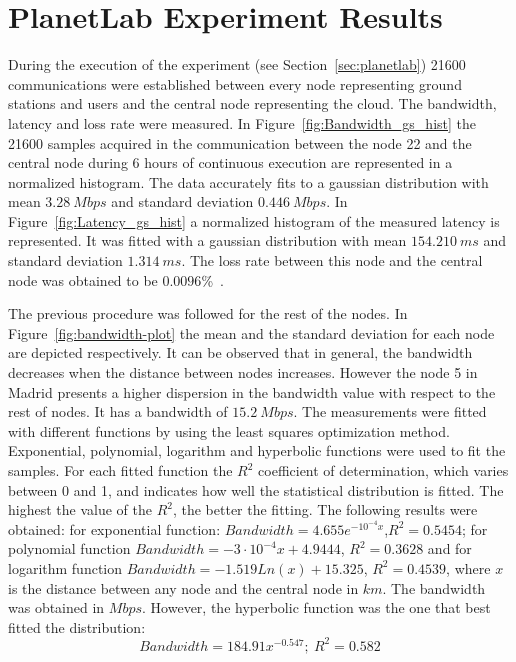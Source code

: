 
\section{PlanetLab Experiment Results}

During the execution of the \pl experiment (see Section~\ref{sec:planetlab}) 21600 communications were established between every node representing ground stations and users and the central node representing the cloud. The bandwidth, latency and loss rate were measured.
In Figure~\ref{fig:Bandwidth_gs_hist} the 21600 samples acquired in the communication between the node 22 and the central node during 6 hours of continuous execution are represented in a normalized histogram. The data accurately fits to a gaussian distribution with mean $3.28~Mbps$ and standard deviation $0.446~Mbps$. In Figure~\ref{fig:Latency_gs_hist} a normalized histogram of the measured latency is represented. It was fitted with a gaussian distribution with mean $154.210~ms$ and standard deviation $1.314~ms$. The loss rate between this node and the central node was obtained to be $0.0096$\%~\cite{Gonzalez2014}.
\begin{figure*}
\begin{center}
\hspace{0.01\textwidth}
\end{center}
\end{figure*}



The previous procedure was followed for the rest of the nodes. In
Figure~\ref{fig:bandwidth-plot} the mean and the standard deviation for each
node are depicted respectively. It can be observed that in general, the
bandwidth decreases when the distance between nodes increases. However the node
5 in Madrid presents a higher dispersion in the bandwidth value with respect to
the rest of nodes. It has a bandwidth of $15.2~Mbps$. The measurements were
fitted with different functions by using the least squares optimization
method. Exponential, polynomial, logarithm and hyperbolic functions were used to
fit the samples. For each fitted function the $R^2$ coefficient of
determination, which varies between 0 and 1, and indicates how well the
statistical distribution is fitted. The highest the value of the $R^2$, the
better the fitting. The following results were obtained: for exponential
function: $Bandwidth=4.655e^{-10^{-4}x}$,$R^2=0.5454$; for polynomial function
$Bandwidth=-3\cdot10^{-4}x+4.9444$, $R^2=0.3628$ and for logarithm function $Bandwidth=-1.519Ln(x)+15.325$, $R^2=0.4539$, where $x$ is the distance between any node and the central node in $km$. The bandwidth was obtained in $Mbps$. However, the hyperbolic function was the one that best fitted the distribution:
\begin{equation}\label{eq:bandwidth_fitting}
Bandwidth=184.91x^{-0.547};~R^2=0.582
\end{equation}

